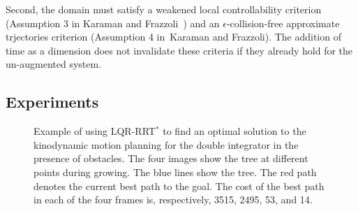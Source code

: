 \documentclass[letterpaper, 10pt, english, conference]{IEEEtran}
\begin{document}
 Second, the domain must satisfy a weakened local
controllability criterion 
(Assumption 3 in Karaman and Frazzoli~\cite{Karaman.Frazzoli:CDC10}) and
an $\epsilon$-collision-free approximate trjectories criterion
(Assumption 4 in~Karaman and Frazzoli\cite{Karaman.Frazzoli:CDC10}). 
The addition of time as a dimension does not invalidate these
criteria if they already hold for the un-augmented system.

\subsection{Experiments}

\begin{figure}
\begin{center}
  \begin{center}
  \end{center}
\end{center}
\caption{Example of using LQR-RRT$^*$ to find an optimal solution to
  the kinodynamic motion planning for the double integrator in the
  presence of obstacles. The four images show the tree at different
  points during growing. The blue lines show the tree. The red path
  denotes the current best path to the goal. The cost of the best path
  in each of the four frames is, respectively, 3515, 2495, 53, and
  14.}
\label{fig:linear_case_study}
\end{figure}
\end{document}
